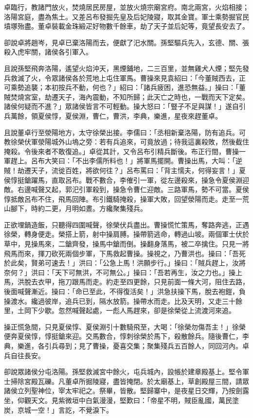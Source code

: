 卓臨行，教諸門放火，焚燒居民房屋，並放火燒宗廟宮府。南北兩宮，火焰相接；洛陽宮庭，盡為焦土。又差呂布發掘先皇及后妃陵寢，取其金寶。軍士乘勢掘官民墳塚殆盡。董卓裝載金珠緞疋好物數千餘車，劫了天子並后妃等，竟望長安去了。

卻說卓將趙岑，見卓已棄洛陽而去，便獻了汜水關。孫堅驅兵先入，玄德、關、張殺入虎牢關，諸侯各引軍入。

且說孫堅飛奔洛陽，遙望火焰沖天，黑煙鋪地，二三百里，並無雞犬人煙；堅先發兵救滅了火，令眾諸侯各於荒地上屯住軍馬。曹操來見袁紹曰：「今董賊西去，正可乘勢追襲；本初按兵不動，何也？」紹曰：「諸兵疲困，進恐無益。」操曰：「董賊焚燒宮室，劫遷天子，海內震動，不知所歸；此天亡之時也，一戰而天下定矣。諸侯何疑而不進？」眾諸侯皆言不可輕動。操大怒曰：「豎子不足與謀！」遂自引兵萬餘，領夏侯惇，夏侯淵，曹仁，曹洪，李典，樂進，星夜來趕董卓。

且說董卓行至滎陽地方，太守徐榮出接。李儒曰：「丞相新棄洛陽，防有追兵。可教徐榮伏軍滎陽城外山塢之旁：若有兵追來，可竟放過；待我這裏殺敗，然後截住掩殺。令後來者不敢復追。」卓從其計，又令呂布引精兵斷後。布正行間，曹操一軍趕上。呂布大笑曰：「不出李儒所料也！」將軍馬擺開。曹操出馬，大叫：「逆賊！劫遷天子，流徙百姓，將欲何往？」呂布罵曰：「背主懦夫，何得妄言！」夏侯惇挺鎗躍馬，直取呂布。戰不數合，李傕引一軍，從左邊殺來，操急令夏侯淵迎敵。右邊喊聲又起，郭汜引軍殺到，操急令曹仁迎敵。三路軍馬，勢不可當。夏侯惇抵敵呂布不住，飛馬回陣。布引鐵騎掩殺，操軍大敗，回望滎陽而走。走至一荒山腳下，時約二更，月明如晝。方纔聚集殘兵。

正欲埋鍋造飯，只聽得四圍喊聲，徐榮伏兵盡出。曹操慌忙策馬，奪路奔逃，正遇徐榮，轉身便走。榮搭上箭，射中操肩膊。操帶箭逃命，轉過山坡。兩個軍士伏於草中，見操馬來，二鎗齊發，操馬中鎗而倒。操翻身落馬，被二卒擒住。只見一將飛馬而來，揮刀砍死兩個步軍，下馬救起曹操。操視之，乃曹洪也。操曰：「吾死於此矣，賢弟可速去！」洪曰：「公急上馬！洪願步行。」操曰：「賊兵趕上，汝將奈何？」洪曰：「天下可無洪，不可無公。」操曰：「吾若再生，汝之力也。」操上馬，洪脫去衣甲，拖刀跟馬而走。約走至四更餘，只見前面一條大河，阻住去路，後面喊聲漸近。操曰：「命已至此，不得復活矣！」洪急扶操下馬，脫去袍鎧，負操渡水。纔過彼岸，追兵已到，隔水放箭。操帶水而走。比及天明，又走三十餘里，土岡下少歇。忽然喊聲起處，一彪人馬趕來，卻是徐榮從上流渡河來追。

操正慌急間，只見夏侯惇、夏侯淵引十數騎飛至，大喝：「徐榮勿傷吾主！」徐榮便奔夏侯惇，惇挺鎗來迎。交馬數合，惇刺徐榮於馬下，殺散餘兵。隨後曹仁，李典，樂進，各引兵尋到；見了曹操，憂喜交集；聚集殘兵五百餘人，同回河內。卓兵自往長安。

卻說眾諸侯分屯洛陽。孫堅救滅宮中餘火，屯兵城內，設帳於建章殿基上。堅令軍士掃除宮殿瓦礫。凡董卓所掘陵寢，盡皆掩閉。於太廟基上，草創殿屋三間，請眾諸侯立列聖神位，宰太牢祀之。祭畢，皆散。堅歸寨中，是夜星日交輝，乃按劍露坐，仰觀天文。見紫微垣中白氣漫漫，堅歎曰：「帝星不明，賊臣亂國，萬民塗炭，京城一空！」言訖，不覺淚下。

